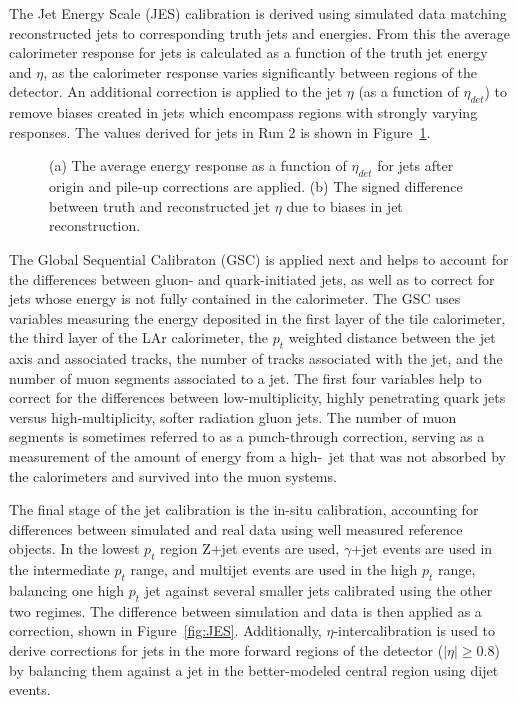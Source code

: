 The Jet Energy Scale (JES) calibration is derived using simulated data matching reconstructed jets to corresponding truth jets and energies.  From this the average calorimeter response for jets is calculated as a function of the truth jet energy and $\eta$, as the calorimeter response varies significantly between regions of the detector.  An additional correction is applied to the jet $\eta$ (as a function of $\eta_{det}$) to remove biases created in jets which encompass regions with strongly varying responses. The values derived for jets in Run 2 is shown in Figure~\ref{fig:JES_Response}.

\begin{figure}[ht!]
	\centering
	\hspace{0.1\textwidth}%
	\caption{(a) The average energy response as a function of $\eta_{det}$ for jets after origin and pile-up corrections are applied. (b) The signed difference between truth and reconstructed jet $\eta$ due to biases in jet reconstruction.\cite{JES}}
	\label{fig:JES_Response}
\end{figure}

The Global Sequential Calibraton (GSC) is applied next and helps to account for the differences between gluon- and quark-initiated jets, as well as to correct for jets whose energy is not fully contained in the calorimeter.  The GSC uses variables measuring the energy deposited in the first layer of the tile calorimeter, the third layer of the LAr calorimeter, the $p_t$ weighted distance between the jet axis and associated tracks, the number of tracks associated with the jet, and the number of muon segments associated to a jet.  The first four variables help to correct for the differences between low-multiplicity, highly penetrating quark jets versus high-multiplicity, softer radiation gluon jets.  The number of muon segments is sometimes referred to as a punch-through correction, serving as a measurement of the amount of energy from a high-\pt~jet that was not absorbed by the calorimeters and survived into the muon systems.

The final stage of the jet calibration is the in-situ calibration, accounting for differences between simulated and real data using well measured reference objects.  In the lowest $p_t$ region Z+jet events are used, $\gamma$+jet events are used in the intermediate $p_t$ range, and multijet events are used in the high $p_t$ range, balancing one high $p_t$ jet against several smaller jets calibrated using the other two regimes.  The difference between simulation and data is then applied as a correction, shown in Figure~\ref{fig:JES}.  Additionally, $\eta$-intercalibration is used to derive corrections for jets in the more forward regions of the detector ($|\eta|\geq0.8$) by balancing them against a jet in the better-modeled central region using dijet events.


